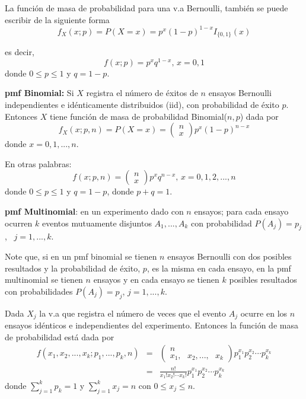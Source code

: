 La función de masa de probabilidad para una v.a Bernoulli, también se puede escribir de la siguiente forma
\begin{equation*}
f_{X}(x;p)=P(X=x)=p^{x}(1-p)^{1-x}I_{\{0,1\}}(x)
\end{equation*}

es decir, 
\begin{equation*}
f(x;p)=p^{x}q^{1-x}\text{, \ }x=0,1
\end{equation*}%
donde $0\leq p\leq 1$ y $q=1-p.$

\vspace{5mm}
\textbf{pmf Binomial:} Si $X$ registra el número de éxitos de $n$ ensayos Bernoulli independientes e idénticamente distribuidos (iid), con probabilidad de éxito $p.$ Entonces $X$ tiene función de masa de probabilidad Binomial($n,p$) dada por 
\begin{equation*}
f_{X}(x;p,n)=P(X=x)=\left( 
\begin{array}{c}
n \\ 
x
\end{array}
\right) p^{x}(1-p)^{n-x}
\end{equation*}%
donde $x=0,1,...,n.$

En otras palabras: 
\begin{equation*}
f(x;p,n)=\left( 
\begin{array}{c}
n \\ 
x
\end{array}%
\right) p^{x}q^{n-x}\text{, \ }x=0,1,2,...,n
\end{equation*}%
donde $0\leq p\leq 1$ y $q=1-p$, donde $p+q=1.$

\vspace{5mm}
\textbf{pmf Multinomial}: en un experimento dado con $n$ ensayos; para cada ensayo ocurren $k$ eventos mutuamente disjuntos $A_{1},...,A_{k}$ con probabilidad $P(A_{j})=p_{j}$, \ $j=1,...,k$.

Note que, si en un pmf binomial se tienen $n$ ensayos Bernoulli con dos posibles resultados y la probabilidad de éxito, $p$, es la misma en cada ensayo, en la pmf multinomial se tienen $n$ ensayos y en cada ensayo se tienen $k$ posibles resultados con probabilidades $P(A_{j})=p_{j}$,  $j=1,...,k$.

Dada $X_{j}$ la v.a que registra el número de veces que el evento $A_{j}$ ocurre en los $n$ ensayos idénticos e independientes del experimento. Entonces la función de masa de probabilidad está dada por
\begin{eqnarray*}
f(x_{1},x_{2},...,x_{k};p_{1},...,p_{k},n) &=&\left( 
\begin{array}{c}
n \\ 
x_{1},\text{ }x_{2},...,\text{ }x_{k}
\end{array}%
\right) p_{1}^{x_{1}}p_{2}^{x_{2}}\cdots p_{k}^{x_{k}} \\
&=&\frac{n!}{x_{1}!x_{2}!\cdots x_{k}!}p_{1}^{x_{1}}p_{2}^{x_{2}}\cdots
p_{k}^{x_{k}}
\end{eqnarray*}%
donde $\sum_{j=1}^{k}p_{k}=1$ y $\sum_{j=1}^{k}x_{j}=n$ con $0\leq x_{j}\leq
n$.

